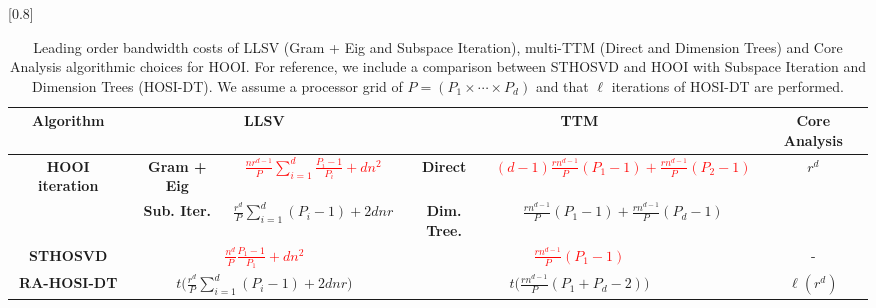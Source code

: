 \begin{table*}
    \scalebox{0.62125}[0.8]{
        \begin{tabular}{c|c|c|c|c|c}
            \bf Algorithm & \multicolumn{2}{|c|}{\bf LLSV} & \multicolumn{2}{|c|}{\bf TTM} & \bf Core Analysis\\ \hline \hline
            \multirow{2}{*}{\bf HOOI iteration} & \bf Gram + Eig & \textcolor{red}{$\frac{nr^{d-1}}{P}\sum_{i=1}^{d}\frac{P_i-1}{P_i} + dn^2$} & \bf Direct & \textcolor{red}{$(d-1)\frac{rn^{d-1}}{P}(P_1 - 1) + \frac{rn^{d-1}}{P}(P_2 - 1)$} & \multirow{2}{*}{$r^d$}\\\cline{2-5}
            & \bf Sub. Iter. & $\frac{r^d}{P}\sum_{i=1}^{d} \left(P_i - 1\right) + 2dnr$ & \bf Dim. Tree. & $\frac{rn^{d-1}}{P}(P_1 - 1) + \frac{rn^{d-1}}{P}(P_d - 1)$\\\hline\hline
            \bf STHOSVD & \multicolumn{2}{|c|}{\textcolor{red}{$\frac{n^d}{P}\frac{P_1-1}{P_1} + dn^2$}} & \multicolumn{2}{|c|}{\textcolor{red}{$\frac{rn^{d-1}}{P}(P_1 - 1)$}} & -\\\hline
            \bf RA-HOSI-DT & \multicolumn{2}{|c|}{$t\Big(\frac{r^d}{P}\sum_{i=1}^{d} (P_i - 1) + 2dnr\Big)$} & \multicolumn{2}{|c|}{$t\Big(\frac{rn^{d-1}}{P}(P_1+P_d-2)\Big)$} & $\ell \left(r^d\right)$\\\hline
        \end{tabular}
    }
    \caption{Leading order bandwidth costs of LLSV (Gram + Eig and Subspace Iteration), multi-TTM (Direct and Dimension Trees) and Core Analysis algorithmic choices for HOOI. For reference, we include a comparison between STHOSVD and HOOI with Subspace Iteration and Dimension Trees (HOSI-DT). We assume a processor grid of $P = (P_1\times \cdots \times P_d)$ and that $\ell$ iterations of HOSI-DT are performed.}
    \label{tab:comm}
\end{table*}